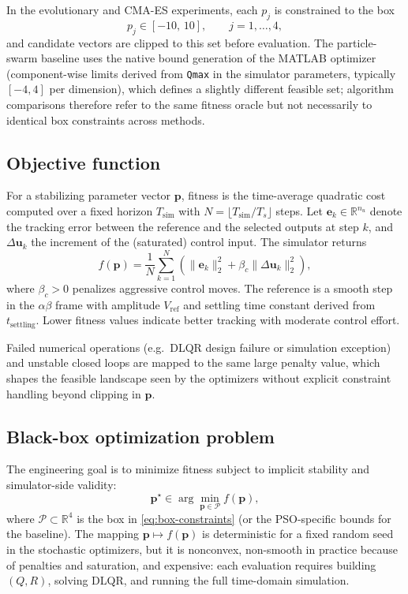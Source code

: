 \documentclass[pdflatex,sn-mathphys-num]{sn-jnl}
\begin{document}
In the evolutionary and CMA-ES experiments, each $p_j$ is constrained to the box
\begin{equation}
  p_j \in [-10,\, 10], \qquad j = 1,\ldots,4,
  \label{eq:box-constraints}
\end{equation}
and candidate vectors are clipped to this set before evaluation.
The particle-swarm baseline uses the native bound generation of the MATLAB optimizer (component-wise limits derived from \texttt{Qmax} in the simulator parameters, typically $[-4,4]$ per dimension), which defines a slightly different feasible set; algorithm comparisons therefore refer to the same fitness oracle but not necessarily to identical box constraints across methods.

\subsection{Objective function}\label{subsec:objective}

For a stabilizing parameter vector $\mathbf{p}$, fitness is the time-average quadratic cost computed over a fixed horizon $T_{\mathrm{sim}}$ with $N = \lfloor T_{\mathrm{sim}} / T_s \rfloor$ steps.
Let $\mathbf{e}_k \in \mathbb{R}^{n_u}$ denote the tracking error between the reference and the selected outputs at step $k$, and $\Delta \mathbf{u}_k$ the increment of the (saturated) control input.
The simulator returns
\begin{equation}
  f(\mathbf{p}) = \frac{1}{N} \sum_{k=1}^{N} \left( \|\mathbf{e}_k\|_2^2 + \beta_c \|\Delta \mathbf{u}_k\|_2^2 \right),
  \label{eq:cost}
\end{equation}
where $\beta_c > 0$ penalizes aggressive control moves.
The reference is a smooth step in the $\alpha\beta$ frame with amplitude $V_{\mathrm{ref}}$ and settling time constant derived from $t_{\mathrm{settling}}$.
Lower fitness values indicate better tracking with moderate control effort.

Failed numerical operations (e.g.\ DLQR design failure or simulation exception) and unstable closed loops are mapped to the same large penalty value, which shapes the feasible landscape seen by the optimizers without explicit constraint handling beyond clipping in $\mathbf{p}$.

\subsection{Black-box optimization problem}\label{subsec:bbo}

The engineering goal is to minimize fitness subject to implicit stability and simulator-side validity:
\begin{equation}
  \mathbf{p}^{\star} \in \arg\min_{\mathbf{p} \in \mathcal{P}} f(\mathbf{p}),
  \label{eq:problem}
\end{equation}
where $\mathcal{P} \subset \mathbb{R}^4$ is the box in \eqref{eq:box-constraints} (or the PSO-specific bounds for the baseline).
The mapping $\mathbf{p} \mapsto f(\mathbf{p})$ is deterministic for a fixed random seed in the stochastic optimizers, but it is nonconvex, non-smooth in practice because of penalties and saturation, and expensive: each evaluation requires building $(Q,R)$, solving DLQR, and running the full time-domain simulation.
\end{document}
